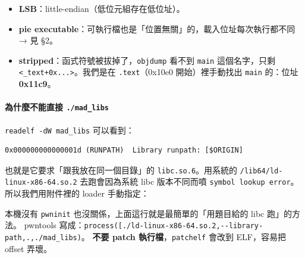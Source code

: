 \documentclass[10pt,a4paper]{article}
\newenvironment{Shaded}{\begin{snugshade}}{\end{snugshade}}
\newcommand{\NormalTok}[1]{#1}
\renewenvironment{Shaded}{%
  \def\FrameCommand{\fboxsep=3.2pt\colorbox{shadecolor}}%
  \MakeFramed{\advance\hsize-\width\FrameRestore\small}%
}{%
  \endMakeFramed
}
\providecommand{\tightlist}{%
  \setlength{\itemsep}{0pt}\setlength{\parskip}{0pt}}
\renewenvironment{quote}{%
  \begin{mdframed}[linewidth=0pt,innerleftmargin=0pt,innerrightmargin=0pt,
    innerbottommargin=0pt,innertopmargin=0pt,skipabove=0.55em,skipbelow=0.55em,
    leftmargin=0.9em,rightmargin=0.4em,startcode={\color{quotebar}\vrule width 2.6pt},%
    endcode={}]%
  \itshape\color{black}%
}{%
  \end{mdframed}%
}
\begin{document}
\begin{itemize}
\tightlist
\item
  \textbf{LSB}：little-endian（低位元組存在低位址）。
\item
  \textbf{pie
  executable}：可執行檔也是「位置無關」的，載入位址每次執行都不同 → 見
  §2。
\item
  \textbf{stripped}：函式符號被拔掉了，\texttt{objdump} 看不到
  \texttt{main} 這個名字，只剩
  \texttt{\textless{}\allowbreak{}\_\allowbreak{}text+0x...\allowbreak{}\textgreater{}\allowbreak{}}。我們是在
  \texttt{.\allowbreak{}text}（0x10e0 開始）裡手動找出 \texttt{main} 的：位址
  \textbf{0x11c9}。
\end{itemize}

\paragraph{\texorpdfstring{為什麼不能直接
\texttt{./\allowbreak{}mad\_\allowbreak{}libs}}{為什麼不能直接 ./mad\_libs}}\label{ux70baux4ec0ux9ebcux4e0dux80fdux76f4ux63a5-.mad_libs}

\texttt{readelf\ \allowbreak{}-\allowbreak{}dW\ \allowbreak{}mad\_\allowbreak{}libs} 可以看到：

\begin{Verbatim}[breaklines=true,breakanywhere=true,breakautoindent=false,fontsize=\fontsize{7.0}{9.5}\selectfont]
0x000000000000001d (RUNPATH)  Library runpath: [$ORIGIN]
\end{Verbatim}

也就是它要求「跟我放在同一個目錄」的 \texttt{libc.\allowbreak{}so.\allowbreak{}6}。用系統的
\texttt{/\allowbreak{}lib64/\allowbreak{}ld-\allowbreak{}linux-\allowbreak{}x86-\allowbreak{}64.\allowbreak{}so.\allowbreak{}2} 去跑會因為系統 libc 版本不同而噴
\texttt{symbol\ \allowbreak{}lookup\ \allowbreak{}error}。所以我們用附件裡的 loader 手動指定：

\begin{Shaded}
\end{Shaded}

\begin{quote}
本機沒有 \texttt{pwninit} 也沒關係，上面這行就是最簡單的「用題目給的
libc 跑」的方法。 pwntools
寫成：\texttt{process({[}\textquotesingle{}\allowbreak{}./\allowbreak{}ld-\allowbreak{}linux-\allowbreak{}x86-\allowbreak{}64.\allowbreak{}so.\allowbreak{}2\textquotesingle{}\allowbreak{},\allowbreak{}\textquotesingle{}\allowbreak{}-\allowbreak{}\/\allowbreak{}-\allowbreak{}library-\allowbreak{}path\textquotesingle{}\allowbreak{},\allowbreak{}\textquotesingle{}\allowbreak{}.\allowbreak{}\textquotesingle{}\allowbreak{},\allowbreak{}\textquotesingle{}\allowbreak{}./\allowbreak{}mad\_\allowbreak{}libs\textquotesingle{}\allowbreak{}{]})}。
\textbf{不要 patch 執行檔}，\texttt{patchelf} 會改到 ELF，容易把 offset
弄壞。
\end{quote}
\end{document}
